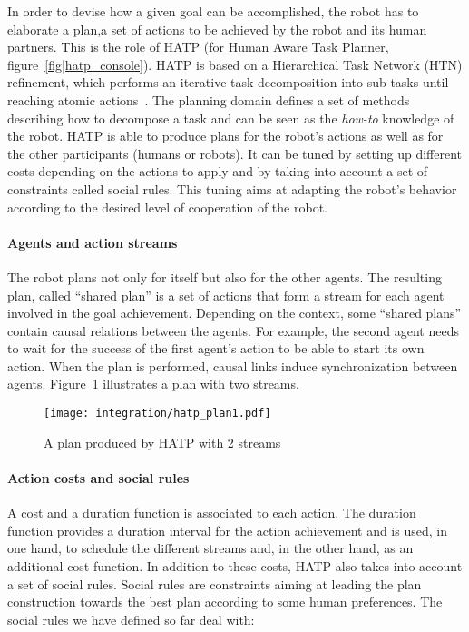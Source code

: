 In order to devise how a given goal can be accomplished, the robot has to
elaborate a plan,\ie a set of actions to be achieved by the robot and its human
partners.  This is the role of HATP \cite{Alili2008} (for Human Aware Task
Planner, figure~\ref{fig|hatp_console}).  HATP is based on a Hierarchical Task
Network (HTN) refinement, which performs an iterative task decomposition into
sub-tasks until reaching atomic actions~\cite{Nau2003}.  The planning domain
defines a set of methods describing how to decompose a task and can be seen as
the {\it how-to} knowledge of the robot.  HATP is able to produce plans for the
robot's actions as well as for the other participants (humans or robots). It
can be tuned by setting up different costs depending on the actions to apply
and by taking into account a set of constraints called social rules. This
tuning aims at adapting the robot's behavior according to the desired level of
cooperation of the robot.

\paragraph{Agents and action streams} The robot plans not only for itself but
also for the other agents. The resulting plan, called ``shared plan'' is a set
of actions that form a stream for each agent involved in the goal achievement.
Depending on the context, some ``shared plans'' contain causal relations
between the agents. For example, the second agent needs to wait for the success
of the first agent's action to be able to start its own action. When the plan
is performed, causal links induce synchronization between agents.
Figure~\ref{plan_hatp1} illustrates a plan with two streams.

\begin{figure}[htbp]
  \centering
  \texttt{[image: integration/hatp\_plan1.pdf]}
  \caption{A plan produced by HATP with 2 streams}
  \label{plan_hatp1}
\end{figure}

\paragraph{Action costs and social rules} A cost and a duration function is
associated to each action.  The duration function provides a duration interval
for the action achievement and is used, in one hand, to schedule the different
streams and, in the other hand, as an additional cost function.  In addition to
these costs, HATP also takes into account a set of social rules.  Social rules
are constraints aiming at leading the plan construction towards the best plan
according to some human preferences. The social rules we have defined so far
deal with:

